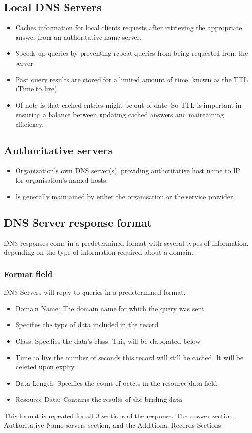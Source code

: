 \documentclass{article}
\begin{document}
\subsection{Local DNS Servers}
\begin{itemize}
    \item Caches information for local clients requests after retrieving the appropriate answer from an authoritative name server.
    \item Speeds up queries by preventing repeat queries from being requested from the server. \item Past query results are stored for a limited amount of time, known as the TTL (Time to live).
    \item Of note is that cached entries might be out of date. So TTL is important in ensuring a balance between updating cached answers and maintaining efficiency.
\end{itemize}
\subsection{Authoritative servers}
\begin{itemize}
    \item Organization's own DNS server(s), providing authoritative host name to IP for organisation's named hosts.
    \item Is generally maintained by either the organisation or the service provider.
\end{itemize}
\subsection{DNS Server response format}
DNS responses come in a predetermined format with several types of information, depending on the type of information required about a domain.
\subsubsection{Format field}
DNS Servers will reply to queries in a predetermined format. 
\begin{itemize}
    \item Domain Name: The domain name for which the query was sent
    \item Specifies the type of data included in the record
    \item Class: Specifies the data's class. This will be elaborated below
    \item Time to live the number of seconds this record will still be cached. It will be deleted upon expiry
    \item Data Length: Specifies the count of octets in the resource data field
    \item Resource Data: Contains the results of the binding data
\end{itemize}
This format is repeated for all 3 sections of the response. The answer section, Authoritative Name servers section, and the Additional Records Sections.
\end{document}
